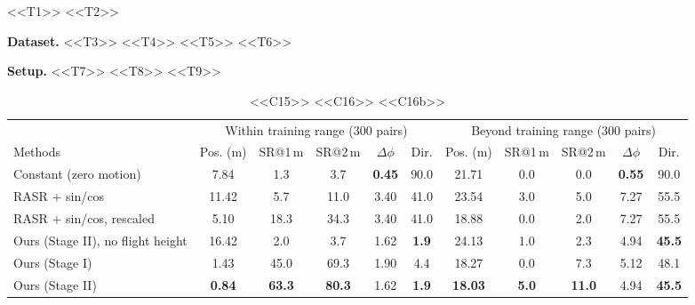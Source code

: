 <<T1>> <<T2>>

\noindent \textbf{Dataset.} <<T3>> <<T4>> <<T5>> <<T6>>

\noindent \textbf{Setup.} <<T7>> <<T8>> <<T9>>

\begin{table}[!t]
    \centering
    \caption{<<C15>> <<C16>> <<C16b>>}
    \label{tab:real}
    \small
    \setlength{\tabcolsep}{3.5pt}
    \begin{tabular}{@{}l|ccccc|ccccc@{}}
    \toprule
    & \multicolumn{5}{c|}{Within training range (300 pairs)} & \multicolumn{5}{c}{Beyond training range (300 pairs)} \\
    Methods & Pos. (m) & SR@1\,m & SR@2\,m & $\Delta\phi$ & Dir. & Pos. (m) & SR@1\,m & SR@2\,m & $\Delta\phi$ & Dir. \\
    \midrule
    Constant (zero motion)       & 7.84  & 1.3  & 3.7  & \textbf{0.45} & 90.0 & 21.71 & 0.0 & 0.0 & \textbf{0.55} & 90.0 \\
    RASR + sin/cos               & 11.42 & 5.7  & 11.0 & 3.40 & 41.0 & 23.54 & 3.0 & 5.0 & 7.27 & 55.5 \\
    RASR + sin/cos, rescaled     & 5.10  & 18.3 & 34.3 & 3.40 & 41.0 & 18.88 & 0.0 & 2.0 & 7.27 & 55.5 \\
    \midrule
    Ours (Stage II), no flight height & 16.42 & 2.0 & 3.7 & 1.62 & \textbf{1.9} & 24.13 & 1.0 & 2.3 & 4.94 & \textbf{45.5} \\
    Ours (Stage I)               & 1.43  & 45.0 & 69.3 & 1.90 & 4.4  & 18.27 & 0.0 & 7.3 & 5.12 & 48.1 \\
    Ours (Stage II)              & \textbf{0.84} & \textbf{63.3} & \textbf{80.3} & 1.62 & \textbf{1.9} & \textbf{18.03} & \textbf{5.0} & \textbf{11.0} & 4.94 & \textbf{45.5} \\
    \bottomrule
    \end{tabular}
\end{table}

